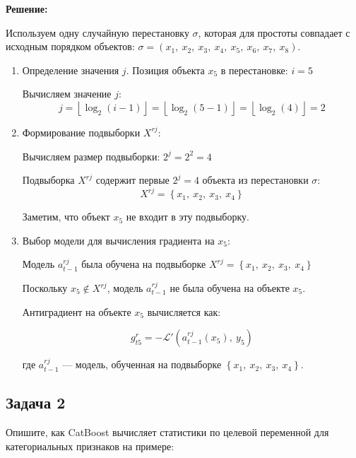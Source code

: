 \textbf{Решение:}

Используем одну случайную перестановку $\sigma$, которая для простоты совпадает с исходным порядком объектов: $\sigma = \left( x_1, \ x_2, \ x_3, \ x_4, \ x_5, \ x_6, \ x_7, \ x_8 \right)$.

\begin{enumerate}
    \item  Определение значения $j$. Позиция объекта $x_5$ в перестановке: $i = 5$

          Вычисляем значение $j$:
          $$
              j = \left\lfloor \log_2(i - 1) \right\rfloor = \left\lfloor \log_2(5 - 1) \right\rfloor = \left\lfloor \log_2(4) \right\rfloor = 2
          $$
    \item  Формирование подвыборки $X^{rj}$:

          Вычисляем размер подвыборки: $2^j = 2^2 = 4$

          Подвыборка $X^{rj}$ содержит первые $2^j = 4$ объекта из перестановки $\sigma$:
          $$
              X^{rj} = \left\{ x_1, \ x_2, \ x_3, \ x_4 \right\}
          $$

          Заметим, что объект $x_5$ не входит в эту подвыборку.

    \item  Выбор модели для вычисления градиента на $x_5$:

          Модель $a_{t-1}^{rj}$ была обучена на подвыборке $X^{rj} = \left\{ x_1, \ x_2, \ x_3, \ x_4 \right\}$

          Поскольку $x_5 \notin X^{rj}$, модель $a_{t-1}^{rj}$ не была обучена на объекте $x_5$.

          Антиградиент на объекте $x_5$ вычисляется как:

          $$
              g_{t5}^r = -\mathcal{L}'\left( a_{t-1}^{rj}(x_5), \ y_5 \right)
          $$

          где \( a_{t-1}^{rj} \) — модель, обученная на подвыборке \( \left\{ x_1, \ x_2, \ x_3, \ x_4 \right\} \).

\end{enumerate}

\subsection*{Задача 2}

Опишите, как CatBoost вычисляет статистики по целевой переменной для категориальных признаков на примере:

